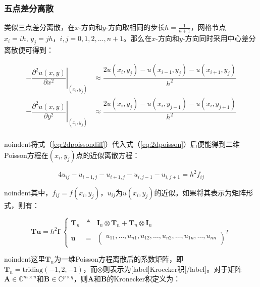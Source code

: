 \documentclass[12pt, UTF8, nofonts]{ctexart}
\begin{document}
\subsubsection*{五点差分离散}

类似三点差分离散，在$x$-方向和$y$-方向取相同的步长$h=\frac{1}{n+1}$，网格节点$x_i=ih,\,y_j=jh$，$i,j=0,1,2,\ldots,n+1$。那么在$x$-方向和$y$-方向同时采用中心差分离散便可得到：

\begin{equation}
    \label{eq:2dpoissondiff}
    \begin{aligned}
        -\left.\dfrac{\partial^2u(x,y)}{\partial x^2}\right|_{(x_i,y_j)}
        &\approx \dfrac{2u(x_i,y_j)-u(x_{i-1},y_j)-u(x_{i+1},y_j)}{h^2} \\
        -\left.\dfrac{\partial^2u(x,y)}{\partial y^2}\right|_{(x_i,y_j)}
        &\approx \dfrac{2u(x_i,y_j)-u(x_i,y_{j-1})-u(x_i,y_{j+1})}{h^2} \\
    \end{aligned}
\end{equation}

noindent将式（\ref{eq:2dpoissondiff}）代入式（\ref{eq:2dpoisson}）后便能得到二维Poisson方程在$(x_i,y_j)$点的近似离散方程：

\begin{equation*}
    4u_{ij}-u_{i-1,j}-u_{i+1,j}-u_{i,j-1}-u_{i,j+1} = h^2f_{ij}
\end{equation*}

noindent其中，$f_{ij}=f(x_i,y_j)$，$u_{ij}$为$u(x_i,y_j)$的近似。如果将其表示为矩阵形式，则有：

\begin{equation*}
    \boldsymbol{T}\boldsymbol{u} = h^2\boldsymbol{f} \;
    \left\{\begin{array}{lcl}
        \boldsymbol{T}_n & \triangleq & \boldsymbol{I}_n \otimes
        \boldsymbol{T}_n + \boldsymbol{T}_n \otimes \boldsymbol{I}_n \\
        \boldsymbol{u} & = & \begin{pmatrix}
            u_{11}, \ldots, u_{n1}, u_{12}, \ldots, u_{n2}, \ldots,
            u_{1n}, \ldots, u_{nn} \\
        \end{pmatrix}^T
    \end{array}\right.
\end{equation*}

noindent这里$\boldsymbol{T}_n$为一维Poisson方程离散后的系数矩阵，即$\boldsymbol{T}_n=\mathrm{tridiag}(-1,2,-1)$，而$\otimes$则表示为[label]Kroecker积[/label]。对于矩阵$\boldsymbol{A}\in\mathbb{C}^{m \times n}$和$\boldsymbol{B}\in\mathbb{C}^{p \times q}$，则$\boldsymbol{A}$和$\boldsymbol{B}$的Kronecker积定义为：
\end{document}
